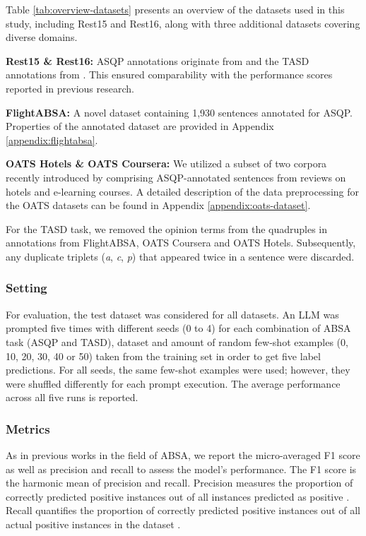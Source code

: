 Table \ref{tab:overview-datasets} presents an overview of the datasets used in this study, including Rest15 and Rest16, along with three additional datasets covering diverse domains.


\textbf{Rest15 \& Rest16:} ASQP annotations originate from \citet{zhang2021aspect} and the TASD annotations from \citet{wan2020target}. This ensured comparability with the performance scores reported in previous research.

\textbf{FlightABSA:} A novel dataset containing 1,930 sentences annotated for ASQP. Properties of the annotated dataset are provided in Appendix \ref{appendix:flightabsa}. 

\textbf{OATS Hotels \& OATS Coursera:} We utilized a subset of two corpora recently introduced by \citet{chebolu2024oats} comprising ASQP-annotated sentences from reviews on hotels and e-learning courses. A detailed description of the data preprocessing for the OATS datasets can be found in Appendix \ref{appendix:oats-dataset}.

For the TASD task, we removed the opinion terms from the quadruples in annotations from FlightABSA, OATS Coursera and OATS Hotels. Subsequently, any duplicate triplets (\textit{a}, \textit{c}, \textit{p}) that appeared twice in a sentence were discarded.

\subsubsection{Setting}

For evaluation, the test dataset was considered for all datasets. An LLM was prompted five times with different seeds (0 to 4) for each combination of ABSA task (ASQP and TASD), dataset and amount of random few-shot examples (0, 10, 20, 30, 40 or 50) taken from the training set in order to get five label predictions. For all seeds, the same few-shot examples were used; however, they were shuffled differently for each prompt execution. The average performance across all five runs is reported.

\subsubsection{Metrics}

As in previous works in the field of ABSA, we report the micro-averaged F1 score as well as precision and recall to assess the model's performance. The F1 score is the harmonic mean of precision and recall. Precision measures the proportion of correctly predicted positive instances out of all instances predicted as positive \cite[p.~67]{jurafsky2000speech}. Recall quantifies the proportion of correctly predicted positive instances out of all actual positive instances in the dataset \cite[p.~67]{jurafsky2000speech}.

